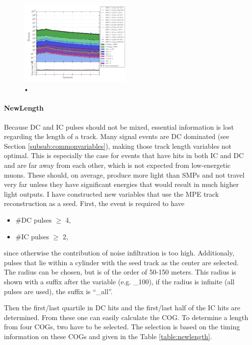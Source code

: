 \begin{figure}
\centering
\includegraphics[width=0.49\textwidth]{chapter8/img/1D_stack_speedratio.png}
\caption{•}
\label{fig:newvariables1}
\end{figure}


\paragraph{NewLength}
Because DC and IC pulses should not be mixed, essential information is lost regarding the length of a track. Many signal events are DC dominated (see Section \ref{subsub:commonvariables}), making those track length variables not optimal. This is especially the case for events that have hits in both IC and DC and are far away from each other, which is not expected from low-energetic muons. These should, on average, produce more light than SMPs and not travel very far unless they have significant energies that would result in much higher light outputs. I have constructed new variables that use the MPE track reconstruction as a seed. First, the event is required to have 

\vspace{2mm}
\begin{itemize}
\item \#DC pulses $\geq$ 4,
\item \#IC pulses $\geq$ 2,
\end{itemize}
\vspace{2mm}
since otherwise the contribution of noise infiltration is too high. Additionaly,
pulses that lie within a cylinder with the seed track as the center are selected. The radius can be chosen, but is of the order of 50-150 meters. This radius is shown with a suffix after the variable (e.g. \_100), if the radius is infinite (all pulses are used), the suffix is ``\_all''. 

Then the first/last quartile in DC hits and the first/last half of the IC hits are determined. From these one can easily calculate the COG. To determine a length from four COGs, two have to be selected. The selection is based on the timing information on these COGs and given in the Table \ref{table:newlength}.\\

